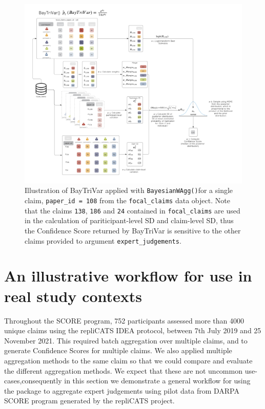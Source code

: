 \documentclass[article]{jss}
\begin{document}
\begin{figure}

{\centering \includegraphics[width=5.67in,height=\textheight]{images/BayesianWAgg.png}

}

\caption{\label{fig-BayesianWAgg}Illustration of BayTriVar applied with
\texttt{BayesianWAgg()}for a single claim, \texttt{paper\_id\ =\ 108}
from the \texttt{focal\_claims} data object. Note that the claims
\texttt{138}, \texttt{186} and \texttt{24} contained in
\texttt{focal\_claims} are used in the calculation of pariticipant-level
SD and claim-level SD, thus the Confidence Score returned by BayTriVar
is sensitive to the other claims provided to argument
\texttt{expert\_judgements}.}

\end{figure}

\hypertarget{sec-workflow}{%
\section{An illustrative workflow for use in real study
contexts}\label{sec-workflow}}

Throughout the SCORE program, 752 participants assessed more than 4000
unique claims using the repliCATS IDEA protocol, between 7th July 2019
and 25 November 2021. This required batch aggregation over multiple
claims, and to generate Confidence Scores for multiple claims. We also
applied multiple aggregation methods to the same claim so that we could
compare and evaluate the different aggregation methods. We expect that
these are not uncommon use-cases,consequently in this section we
demonstrate a general workflow for using the  package to
aggregate expert judgements using pilot data from DARPA SCORE program
generated by the repliCATS project.
\end{document}
